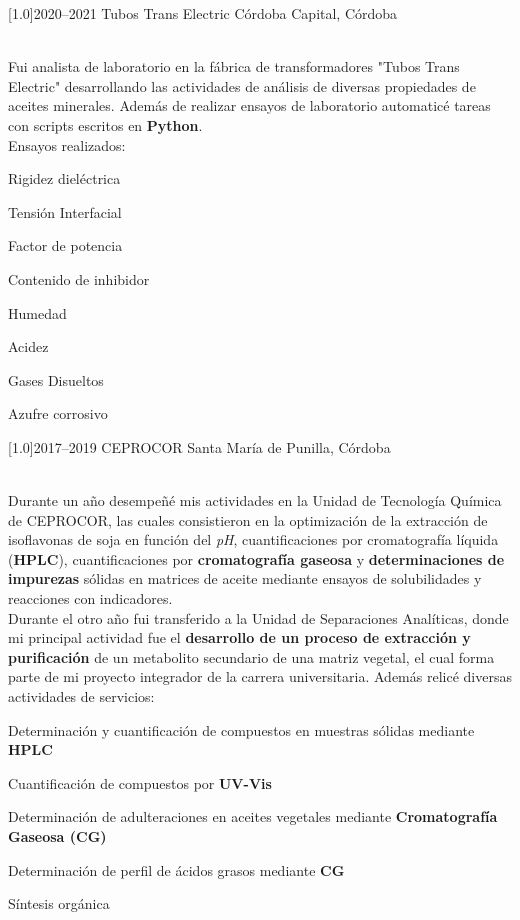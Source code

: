 \documentclass[espanol]{cv-style}     %
\begin{document}
\begin{entrylist}
\entry
  {\scalebox{.7}[1.0]{2020--2021}}
  {Tubos Trans Electric}
  {Córdoba Capital, Córdoba}
  {\\
	  Fui analista de laboratorio en la fábrica de transformadores {"Tubos Trans Electric"} desarrollando las actividades de análisis de diversas propiedades de aceites minerales. Además de realizar ensayos de laboratorio automaticé tareas con scripts escritos en \textbf{Python}. \\
  Ensayos realizados:
  \begin{itemize}\small{
      \item Rigidez dieléctrica
      \item Tensión Interfacial
      \item Factor de potencia
      \item Contenido de inhibidor
      \item Humedad
      \item Acidez
      \item Gases Disueltos
      \item Azufre corrosivo}
  \end{itemize}
  }

\entry
  {\scalebox{.8}[1.0]{2017--2019}}
  {CEPROCOR}
  {Santa María de Punilla, Córdoba}
  {\\
  Durante un año desempeñé mis actividades en la Unidad de Tecnología Química de CEPROCOR, las cuales consistieron en la optimización de la extracción de isoflavonas de soja en función del \textit{pH}, cuantificaciones por cromatografía líquida (\textbf{HPLC}), cuantificaciones por \textbf{cromatografía gaseosa} y \textbf{determinaciones de impurezas} sólidas en matrices de aceite mediante ensayos de solubilidades y reacciones con indicadores. \\
  Durante el otro año fui transferido a la Unidad de Separaciones Analíticas, donde mi principal actividad fue el \textbf{desarrollo de un proceso de extracción y purificación} de un metabolito secundario de una matriz vegetal, el cual forma parte de mi proyecto integrador de la carrera universitaria.
  Además relicé diversas actividades de servicios:
  \begin{itemize}\small{
  \item Determinación y cuantificación de compuestos en muestras sólidas mediante \textbf{HPLC}
  \item Cuantificación de compuestos por \textbf{UV-Vis}
  \item Determinación de adulteraciones en aceites vegetales mediante \textbf{Cromatografía Gaseosa (CG)}
  \item Determinación de perfil de ácidos grasos mediante \textbf{CG}
  \item Síntesis orgánica
  }
  \end{itemize}
  }


\end{entrylist}
\end{document}
